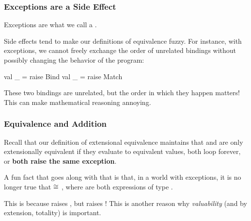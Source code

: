 \documentclass[aspectratio=169, handout]{beamer}
\begin{document}
\begin{frame}[fragile]
  \frametitle{Exceptions are a Side Effect}

  Exceptions are what we call a .

  \pause
  \vspace{\fill}


  \pause
  \vspace{\fill}

  Side effects tend to make our definitions of equivalence fuzzy. For instance,
  with exceptions, we cannot freely exchange the order of unrelated
   bindings without possibly changing the behavior of the program:
  \begin{codeblock}
    val _ = raise Bind
    val _ = raise Match
  \end{codeblock}
  These two bindings are unrelated, but the order in which they happen
  matters! This can make mathematical reasoning annoying.
\end{frame}

\begin{frame}[fragile]
  \frametitle{Equivalence and Addition}

  \ptsnmtmt

  Recall that our definition of extensional equivalence maintains that 
  and  are only extensionally equivalent if they evaluate to equivalent
  values, both loop forever, or \textbf{both raise the same exception}.

  \pause
  \vspace{\fill}

  A fun fact that goes along with that is that, in a world with exceptions, it is
  no longer true that  $\cong$ , where  are
  both expressions of type .

  \pause
  \vspace{\fill}

  This is because  raises , but
   raises ! This is another reason
  why \textit{valuability} (and by extension, totality) is important.
\end{frame}
\end{document}
